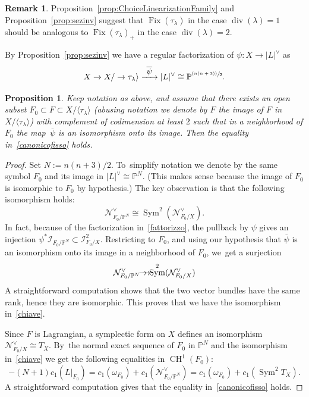\documentclass[JEP,XML,SOM,Unicode,published]{cedram}
\newcommand{\onto}{\mathchoice{\to\hspace*{-5mm}\to}{\mathrel{\hbox{$\to\hspace*{-2.85mm}\to$}}}{\to\hspace*{-3mm}\to}{\to\hspace*{-3mm}\to}}
\newcommand\To[1]{\mathchoice{\xrightarrow{\textstyle\kern4pt#1\kern3pt}}{\stackrel{#1}{\longrightarrow}}{}{}}
\newcommand{\psfrac}[2]{\sfrac{(#1)}{#2}}
\newcommand{\PP}{{\mathbb P}}\let\P\PP
\newcommand\cI{\mathcal{I}}
\newcommand\cN{\mathcal{N}}
\DeclareMathOperator{\CH}{CH}
\DeclareMathOperator{\divisore}{div}\let\div\divisore
\DeclareMathOperator{\Fix}{Fix}
\DeclareMathOperator{\Sym}{Sym}
\let\la\langle
\let\ov\overline
\let\ra\rangle
\newtheorem{prop}[lemm]{Proposition}
\theoremstyle{definition}
\newtheorem{rema}[lemm]{Remark}
\begin{document}
\begin{rema}
Proposition~\ref{prop:ChoiceLinearizationFamily} and Proposition~\ref{prop:sezinv}
suggest that $\Fix(\tau_{\lambda})$ in the case $\divisore(\lambda)=1$ should be analogous to $\Fix(\tau_{\lambda})_{+}$ in the case $\divisore(\lambda)=2$.
\end{rema}

By Proposition~\ref{prop:sezinv}
we have a regular factorization of $\psi\colon X\to |L|^{\vee}$ as\vspace*{-5pt}
\begin{equation}\label{fattorizzo}
X\to X/\to \tau_{\lambda}\ra \To{\ov{\psi}} |L|^{\vee}\cong\PP^{\psfrac{n(n+3)}{2}}.
\end{equation}

\begin{prop}
Keep notation as above, and assume that there exists an open subset
$F_0\subset F\subset X/\la \tau_{\lambda}\ra$ (abusing notation we denote by $F$ the image of $F$ in $X/\la \tau_{\lambda}\ra$) with complement of codimension at least $2$ such that in a neighborhood of $F_0$ the map~$\ov{\psi}$ is an isomorphism onto its image. Then the equality in~\eqref{canonicofisso} holds.
\end{prop}

\begin{proof}
Set $N:=n(n+3)/2$. To~simplify notation we denote by the same symbol $F_0$ and its image in $|L|^{\vee}\cong\PP^{N}$. (This makes sense because the image of $F_0$ is isomorphic to $F_0$ by hypothesis.) The key observation is that the following isomorphism holds:\vspace*{-3pt}
\begin{equation}\label{chiave}
\cN^{\vee}_{F_0/\PP^N}\cong \Sym^2(\cN^{\vee}_{F_0/X}).
\end{equation}
In fact, because of the factorization in~\eqref{fattorizzo}, the pullback by $\psi$ gives an injection $\psi^{*}\cI_{F_0/\PP^N}\subset \cI_{F_0/X}^2$. Restricting to $F_0$, and using our hypothesis that $\ov{\psi}$ is an isomorphism onto its image in a neighborhood of $F_0$, we~get a surjection\vspace*{-3pt}
\begin{equation*}
\cN_{F_0/\PP^N}^{\vee}\onto \Sym^2(\cN^{\vee}_{F_0/X})
\end{equation*}
A straightforward computation shows that the two vector bundles have the same rank, hence they are isomorphic. This proves that we have the isomorphism in~\eqref{chiave}.

Since $F$ is Lagrangian, a symplectic form on $X$ defines an isomorphism \hbox{$\cN^{\vee}_{F_0/X}\!\cong\! T_X$}. By~the normal exact sequence of $F_0$ in $\PP^N$ and the isomorphism in~\eqref{chiave} we get the following equalities in $\CH^1(F_0)$:\vspace*{-3pt}
\begin{equation*}
-(N+1) c_1(L|_{F_0})=c_1(\omega_{F_0})+c_1(\cN^{\vee}_{F_0/\PP^N})=
c_1(\omega_{F_0})+c_1(\Sym^2 T_X).
\end{equation*}
A straightforward computation gives that the equality in~\eqref{canonicofisso} holds.
\end{proof}

\backmatter


\enlargethispage{\baselineskip}
\end{document}
